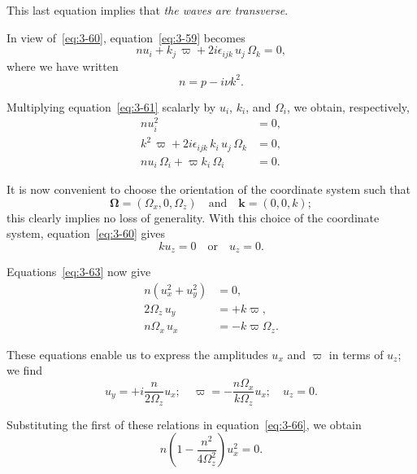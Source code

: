This last equation implies that \emph{the waves are transverse}.

In view of~\eqref{eq:3-60}, equation~\eqref{eq:3-59} becomes
\begin{equation}\label{eq:3-61}
n u_i + k_j\,\varpi + 2i\epsilon_{ijk}\, u_j\,\Omega_k = 0,
\end{equation}
where we have written
\begin{equation}\label{eq:3-62}
n = p - i\nu k^2.
\end{equation}

Multiplying equation~\eqref{eq:3-61} scalarly by $u_i$, $k_i$, and $\Omega_i$, we obtain, respectively,
\begin{equation}\label{eq:3-63}
\begin{aligned}
n u_i^2 &= 0, \\
k^2\,\varpi + 2i\epsilon_{ijk}\, k_i\, u_j\,\Omega_k &= 0, \\
n u_i\,\Omega_i + \varpi k_i\,\Omega_i &= 0.
\end{aligned}
\end{equation}

It is now convenient to choose the orientation of the coordinate system such that
\begin{equation}\label{eq:3-64}
\boldsymbol{\Omega} = (\Omega_x, 0, \Omega_z) \quad \text{and} \quad \mathbf{k} = (0,0,k);
\end{equation}
this clearly implies no loss of generality. With this choice of the coordinate system, equation~\eqref{eq:3-60} gives
\begin{equation}\label{eq:3-65}
k u_z = 0 \quad \text{or} \quad u_z = 0.
\end{equation}

Equations~\eqref{eq:3-63} now give
\begin{align}
n(u_x^2 + u_y^2) &= 0, \label{eq:3-66}\\
2\Omega_z\, u_y &= +k\varpi, \label{eq:3-67}\\
n\Omega_x\, u_x &= -k\varpi\Omega_z. \label{eq:3-68}
\end{align}

These equations enable us to express the amplitudes $u_x$ and $\varpi$ in terms of $u_z$; we find
\begin{equation}\label{eq:3-69}
u_y = +i\frac{n}{2\Omega_z}u_x; \quad \varpi = -\frac{n\Omega_x}{k\Omega_z}u_x; \quad u_z = 0.
\end{equation}

Substituting the first of these relations in equation~\eqref{eq:3-66}, we obtain
\begin{equation}\label{eq:3-70}
n\!\left(1 - \frac{n^2}{4\Omega_z^2}\right)\!u_x^2 = 0.
\end{equation}

